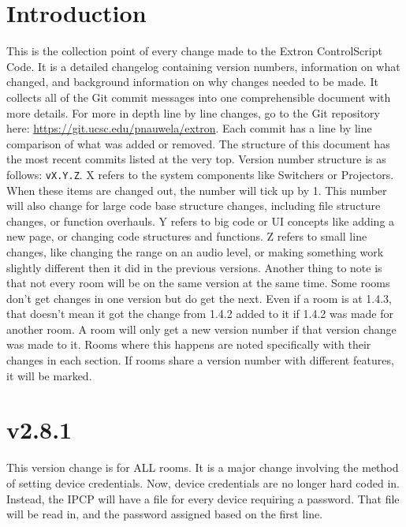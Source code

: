 \documentclass{article}
\title{\TITLE}
\author{\NAME}
\date{\OFFICE}
\begin{document}
\pagestyle{fancy}
\fancyfoot{}
\fancyhead{}
\fancyfoot[L]{\TITLE\ -- \OFFICE}
\fancyfoot[R]{\thepage}

\maketitle

\section*{Introduction}\label{sec:Intro}

This is the collection point of every change made to the Extron ControlScript Code. It is a detailed changelog containing version numbers, information on what changed, and background information on why changes needed to be made. It collects all of the Git commit messages into one comprehensible document with more details. For more in depth line by line changes, go to the Git repository here: \url{https://git.ucsc.edu/pnauwela/extron}. Each commit has a line by line comparison of what was added or removed. The structure of this document has the most recent commits listed at the very top. Version number structure is as follows: \lstinline|vX.Y.Z|. X refers to the system components like Switchers or Projectors. When these items are changed out, the number will tick up by 1. This number will also change for large code base structure changes, including file structure changes, or function overhauls. Y refers to big code or UI concepts like adding a new page, or changing code structures and functions. Z refers to small line changes, like changing the range on an audio level, or making something work slightly different then it did in the previous versions. Another thing to note is that not every room will be on the same version at the same time. Some rooms don't get changes in one version but do get the next. Even if a room is at 1.4.3, that doesn't mean it got the change from 1.4.2 added to it if 1.4.2 was made for another room. A room will only get a new version number if that version change was made to it. Rooms where this happens are noted specifically with their changes in each section. If rooms share a version number with different features, it will be marked. 

\section*{v2.8.1}

This version change is for ALL rooms. It is a major change involving the method of setting device credentials. Now, device credentials are no longer hard coded in. Instead, the IPCP will have a file for every device requiring a password. That file will be read in, and the password assigned based on the first line. 
\end{document}
